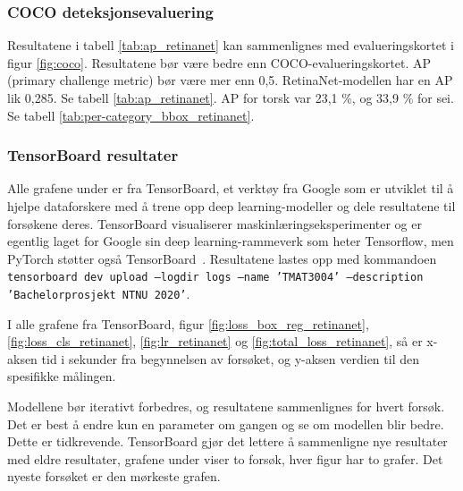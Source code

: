 \subsubsection{COCO deteksjonsevaluering} 

Resultatene i tabell \ref{tab:ap_retinanet} kan sammenlignes med evalueringskortet i figur \ref{fig:coco}. Resultatene bør være bedre enn COCO-evalueringskortet. AP (primary challenge metric) bør være mer enn 0,5. RetinaNet-modellen har en AP lik 0,285. Se tabell \ref{tab:ap_retinanet}. AP for torsk var 23,1 \%, og 33,9 \% for sei. Se tabell \ref{tab:per-category_bbox_retinanet}.



\subsubsection{TensorBoard resultater}

Alle grafene under er fra TensorBoard, et verktøy fra Google som er utviklet til å hjelpe dataforskere med å trene opp deep learning-modeller og dele resultatene til forsøkene deres. TensorBoard visualiserer maskinlæringseksperimenter og er egentlig laget for Google sin deep learning-rammeverk som heter Tensorflow, men PyTorch støtter også TensorBoard \cite{Oshri 2019}. Resultatene lastes opp med kommandoen \texttt{tensorboard dev upload --logdir logs --name 'TMAT3004' --description 'Bachelorprosjekt NTNU 2020'}.

I alle grafene fra TensorBoard, figur \ref{fig:loss_box_reg_retinanet}, \ref{fig:loss_cls_retinanet}, \ref{fig:lr_retinanet} og \ref{fig:total_loss_retinanet}, så er x-aksen tid i sekunder fra begynnelsen av forsøket, og y-aksen verdien til den spesifikke målingen. 

Modellene bør iterativt forbedres, og resultatene sammenlignes for hvert forsøk. Det er best å endre kun en parameter om gangen og se om modellen blir bedre. Dette er tidkrevende. TensorBoard gjør det lettere å sammenligne nye resultater med eldre resultater, grafene under viser to forsøk, hver figur har to grafer. Det nyeste forsøket er den mørkeste grafen.

